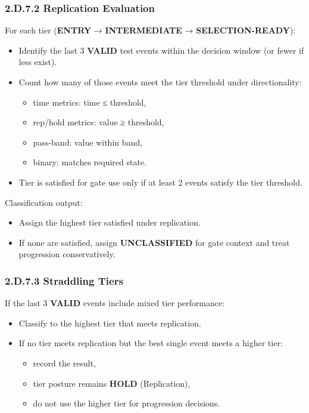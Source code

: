 \documentclass[10pt]{article}
\begin{document}
\subsubsection*{2.D.7.2 Replication Evaluation }

For each tier (\textbf{ENTRY} → \textbf{INTERMEDIATE} → \textbf{SELECTION-READY}):

\begin{itemize}
\item Identify the last 3 \textbf{VALID} test events within the decision window (or fewer if less exist).
\item Count how many of those events meet the tier threshold under directionality:
  \begin{itemize}
  \item time metrics: time ≤ threshold,
  \item rep/hold metrics: value ≥ threshold,
  \item pass-band: value within band,
  \item binary: matches required state.
  \end{itemize}
\item Tier is satisfied for gate use only if at least 2 events satisfy the tier threshold.
\end{itemize}

Classification output:

\begin{itemize}
\item Assign the highest tier satisfied under replication.
\item If none are satisfied, assign \textbf{UNCLASSIFIED} for gate context and treat progression conservatively.
\end{itemize}

\subsubsection*{2.D.7.3 Straddling Tiers}

If the last 3 \textbf{VALID} events include mixed tier performance:

\begin{itemize}
\item Classify to the highest tier that meets replication.
\item If no tier meets replication but the best single event meets a higher tier:
  \begin{itemize}
  \item record the result,
  \item tier posture remains \textbf{HOLD} (Replication),
  \item do not use the higher tier for progression decisions.
  \end{itemize}
\end{itemize}
\end{document}
